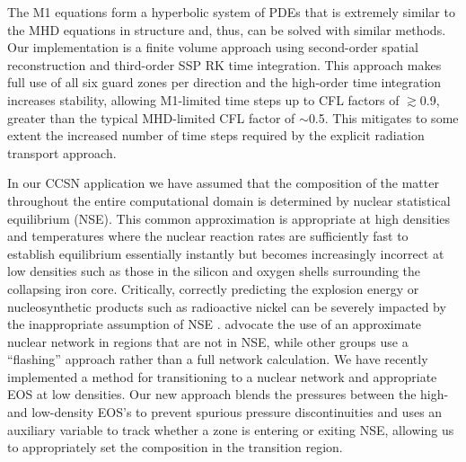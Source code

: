 The M1 equations form a hyperbolic system of PDEs that is extremely similar to the MHD equations in structure and, thus, can be solved with similar methods.
Our implementation is a finite volume approach using second-order spatial reconstruction and third-order SSP RK time integration.
This approach makes full use of all six guard zones per direction and the high-order time integration increases stability, allowing M1-limited time steps up to CFL factors of $\gtrsim$0.9, greater than the typical MHD-limited CFL factor of $\sim$0.5.
This mitigates to some extent the increased number of time steps required by the explicit radiation transport approach.

In our \flash CCSN application we have assumed that the composition of the matter throughout the entire computational domain is determined by nuclear statistical equilibrium (NSE).
This common approximation \citep[e.g.,][]{Burrows:2007, Ott:2008, Dolence:2015, Skinner:2016, Roberts:2016, Kuroda:2016} is appropriate at high densities and temperatures where the nuclear reaction rates are sufficiently fast to establish equilibrium essentially instantly but becomes increasingly incorrect at low densities such as those in the silicon and oxygen shells surrounding the collapsing iron core.
Critically, correctly predicting the explosion energy or nucleosynthetic products such as radioactive nickel can be severely impacted by the inappropriate assumption of NSE \citep{Bruenn:2016}.
\citet{Bruenn:2016} advocate the use of an approximate nuclear network in regions that are not in NSE, while other groups \citep[e.g.,][]{Muller:2012a, Melson:2015} use a ``flashing'' approach rather than a full network calculation.
We have recently implemented a method for transitioning to a nuclear network and appropriate EOS at low densities.
Our new approach blends the pressures between the high- and low-density EOS's to prevent spurious pressure discontinuities and uses an auxiliary variable to track whether a zone is entering or exiting NSE, allowing us to appropriately set the composition in the transition region.

